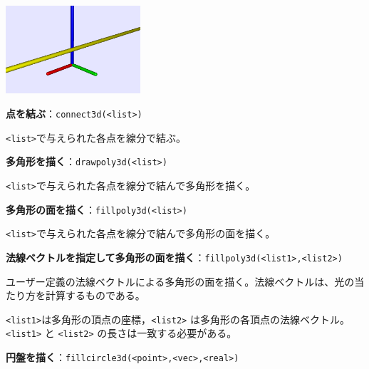 \documentclass[papersize,a4paper,12pt,uplatex]{jsarticle}
\begin{document}
\hspace{30mm} \includegraphics[bb=0 0 346 226 , width=5cm]{Cfig/draw3d.png} 

\hypertarget{connect3d}{}
\vspace{\baselineskip}
\noindent
{\bf 点を結ぶ}：\verb|connect3d(<list>)|

\verb|<list>|で与えられた各点を線分で結ぶ。

\vspace{\baselineskip}
 

\hypertarget{drawpoly3d}{}
\vspace{\baselineskip}
\noindent
{\bf 多角形を描く}：\verb|drawpoly3d(<list>)|

\verb|<list>|で与えられた各点を線分で結んで多角形を描く。

\vspace{\baselineskip}
 

\hypertarget{fillpoly3d}{}
\vspace{\baselineskip}
\noindent
{\bf 多角形の面を描く}：\verb|fillpoly3d(<list>)|

\verb|<list>|で与えられた各点を線分で結んで多角形の面を描く。

\vspace{\baselineskip}
 

\vspace{\baselineskip}
\noindent
{\bf 法線ベクトルを指定して多角形の面を描く}：\verb|fillpoly3d(<list1>,<list2>)|

ユーザー定義の法線ベクトルによる多角形の面を描く。法線ベクトルは、光の当たり方を計算するものである。

\verb|<list1>|は多角形の頂点の座標，\verb|<list2>| は多角形の各頂点の法線ベクトル。 \verb|<list1>| と \verb|<list2>| の長さは一致する必要がある。

\vspace{\baselineskip}
 

\hypertarget{fillcircle3d}{}
\vspace{\baselineskip}
\noindent
{\bf 円盤を描く}：\verb|fillcircle3d(<point>,<vec>,<real>)|
\end{document}
